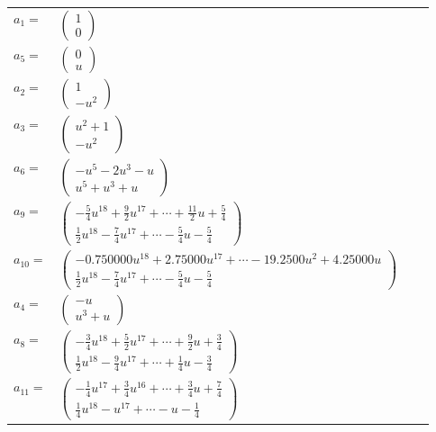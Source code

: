 \documentclass[1p]{elsarticle_modified}
\theoremstyle{definition}
\begin{document}
\begin{tabular}{m{7pt} m{180pt} m{7pt} m{180pt} }
\flushright $a_{1}=$&$\begin{pmatrix}1\\0\end{pmatrix}$ \\
\flushright $a_{5}=$&$\begin{pmatrix}0\\u\end{pmatrix}$ \\
\flushright $a_{2}=$&$\begin{pmatrix}1\\- u^2\end{pmatrix}$ \\
\flushright $a_{3}=$&$\begin{pmatrix}u^2+1\\- u^2\end{pmatrix}$ \\
\flushright $a_{6}=$&$\begin{pmatrix}- u^5-2 u^3- u\\u^5+u^3+u\end{pmatrix}$ \\
\flushright $a_{9}=$&$\begin{pmatrix}-\frac{5}{4} u^{18}+\frac{9}{2} u^{17}+\cdots+\frac{11}{2} u+\frac{5}{4}\\\frac{1}{2} u^{18}-\frac{7}{4} u^{17}+\cdots-\frac{5}{4} u-\frac{5}{4}\end{pmatrix}$ \\
\flushright $a_{10}=$&$\begin{pmatrix}-0.750000 u^{18}+2.75000 u^{17}+\cdots-19.2500 u^{2}+4.25000 u\\\frac{1}{2} u^{18}-\frac{7}{4} u^{17}+\cdots-\frac{5}{4} u-\frac{5}{4}\end{pmatrix}$ \\
\flushright $a_{4}=$&$\begin{pmatrix}- u\\u^3+u\end{pmatrix}$ \\
\flushright $a_{8}=$&$\begin{pmatrix}-\frac{3}{4} u^{18}+\frac{5}{2} u^{17}+\cdots+\frac{9}{2} u+\frac{3}{4}\\\frac{1}{2} u^{18}-\frac{9}{4} u^{17}+\cdots+\frac{1}{4} u-\frac{3}{4}\end{pmatrix}$ \\
\flushright $a_{11}=$&$\begin{pmatrix}-\frac{1}{4} u^{17}+\frac{3}{4} u^{16}+\cdots+\frac{3}{4} u+\frac{7}{4}\\\frac{1}{4} u^{18}- u^{17}+\cdots- u-\frac{1}{4}\end{pmatrix}$ \\

\end{tabular}
\end{document}
